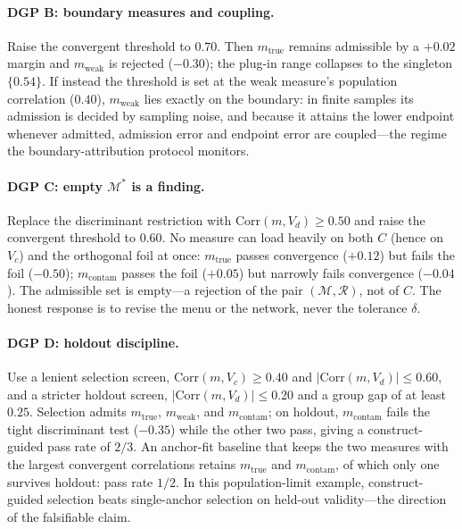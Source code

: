\documentclass[10pt,letterpaper]{article}
\newcommand{\M}{\ensuremath{\mathcal{M}}}
\newcommand{\Rset}{\mathcal{R}}
\begin{document}
\paragraph{DGP B: boundary measures and coupling.}
Raise the convergent threshold to $0.70$.
Then $m_{\mathrm{true}}$ remains admissible by a $+0.02$ margin and $m_{\mathrm{weak}}$ is rejected ($-0.30$); the plug-in range collapses to the singleton $\{0.54\}$.
If instead the threshold is set at the weak measure's population correlation ($0.40$), $m_{\mathrm{weak}}$ lies exactly on the boundary: in finite samples its admission is decided by sampling noise, and because it attains the lower endpoint whenever admitted, admission error and endpoint error are coupled---the regime the boundary-attribution protocol monitors.

\paragraph{DGP C: empty $\M^*$ is a finding.}
Replace the discriminant restriction with $\mathrm{Corr}(m,V_d)\ge 0.50$ and raise the convergent threshold to $0.60$.
No measure can load heavily on both $C$ (hence on $V_c$) and the orthogonal foil at once: $m_{\mathrm{true}}$ passes convergence ($+0.12$) but fails the foil ($-0.50$); $m_{\mathrm{contam}}$ passes the foil ($+0.05$) but narrowly fails convergence ($-0.04$).
The admissible set is empty---a rejection of the pair $(\M,\Rset)$, not of $C$.
The honest response is to revise the menu or the network, never the tolerance $\delta$.

\paragraph{DGP D: holdout discipline.}
Use a lenient selection screen, $\mathrm{Corr}(m,V_c)\ge 0.40$ and $|\mathrm{Corr}(m,V_d)|\le 0.60$, and a stricter holdout screen, $|\mathrm{Corr}(m,V_d)|\le 0.20$ and a group gap of at least $0.25$.
Selection admits $m_{\mathrm{true}}$, $m_{\mathrm{weak}}$, and $m_{\mathrm{contam}}$; on holdout, $m_{\mathrm{contam}}$ fails the tight discriminant test ($-0.35$) while the other two pass, giving a construct-guided pass rate of $2/3$.
An anchor-fit baseline that keeps the two measures with the largest convergent correlations retains $m_{\mathrm{true}}$ and $m_{\mathrm{contam}}$, of which only one survives holdout: pass rate $1/2$.
In this population-limit example, construct-guided selection beats single-anchor selection on held-out validity---the direction of the falsifiable claim.
\end{document}
